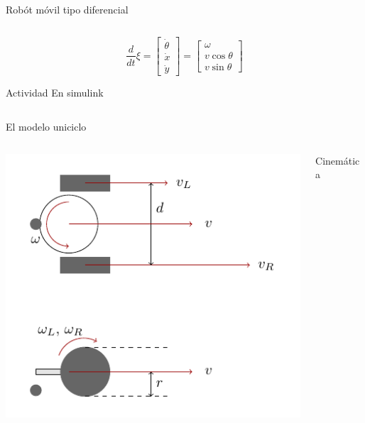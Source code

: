 \documentclass[presentation,aspectratio=169]{beamer}
\begin{document}
\begin{frame}[label={sec:orga452f6c}]{Robót móvil tipo diferencial}
\begin{columns}
\begin{column}{0.6\columnwidth}
\[\frac{d}{dt} \xi = \begin{bmatrix} \dot{\theta}\\\dot{x}\\\dot{y} \end{bmatrix} = \begin{bmatrix} \omega\\ v\cos\theta\\v\sin\theta\end{bmatrix} \]


\pause

\alert{Actividad} En simulink
\end{column}
\end{columns}
\end{frame}



\begin{frame}[label={sec:org2bf68b7}]{El modelo uniciclo}
\begin{columns}
\begin{column}{0.4\columnwidth}
\begin{center}
 \includegraphics[width=1.0\linewidth]{../figures/unicycle-model-details}
\end{center}
\end{column}

\begin{column}{0.6\columnwidth}
\alert{Cinemática}

\pause


\end{column}
\end{columns}
\end{frame}
\end{document}
